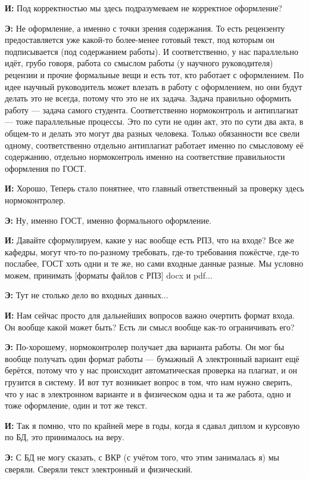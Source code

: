\textbf{И: }Под корректностью мы здесь подразумеваем не корректное оформление?

\textbf{Э: }Не оформление, а именно с точки зрения содержания. То есть рецензенту предоставляется уже какой-то более-менее готовый текст, под которым он подписывается (под содержанием работы). И соответственно, у нас параллельно идёт, грубо говоря, работа со смыслом работы (у научного руководителя) рецензии и прочие формальные вещи и есть тот, кто работает с оформлением. По идее научный руководитель может влезать в работу с оформлением, но они будут делать это не всегда, потому что это не их задача. Задача правильно оформить работу --- задача самого студента. Соответственно нормоконтроль и антиплагиат --- тоже параллельные процессы. Это по сути не один акт, это по сути два акта, в общем-то и делать это могут два разных человека. Только обязанности все свели одному, соответственно отдельно антиплагиат работает именно по смысловому её содержанию, отдельно нормоконтроль именно на соответствие правильности оформления по ГОСТ.

\textbf{И: }Хорошо, Теперь стало понятнее, что главный ответственный за проверку здесь нормоконтролер. 

\textbf{Э: }Ну, именно ГОСТ, именно формального оформление.

\textbf{И: }Давайте сформулируем, какие у нас вообще есть РПЗ, что на входе? Все же кафедры, могут что-то по-разному требовать, где-то требования пожёстче, где-то послабее, ГОСТ хоть одни и те же, но сами входные данные разные. Мы условно можем, принимать [форматы файлов с РПЗ] docx и pdf...

\textbf{Э: }Тут не столько дело во входных данных...

\textbf{И: }Нам сейчас просто для дальнейших вопросов важно очертить формат входа. Он вообще какой может быть? Есть ли смысл вообще как-то ограничивать его?

\textbf{Э: }По-хорошему, нормоконтролер получает два варианта работы. Он мог бы вообще получать один формат работы --- бумажный А электронный вариант ещё берётся, потому что у нас происходит автоматическая проверка на плагиат, и он грузится в систему. И вот тут возникает вопрос в том, что нам нужно сверить, что у нас в электронном варианте и в физическом одна и та же работа, одно и тоже оформление, один и тот же текст.

\textbf{И: }Так я помню, что по крайней мере в годы, когда я сдавал диплом и курсовую по БД, это принималось на веру. 

\textbf{Э: }С БД не могу сказать, с ВКР (с учётом того, что этим занималась я) мы сверяли. Сверяли текст электронный и физический.

